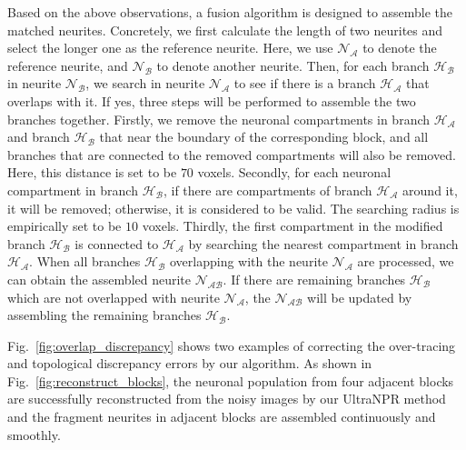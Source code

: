 Based on the above observations, a fusion algorithm is designed to assemble the matched neurites.
Concretely, we first calculate the length of two neurites and select the longer one as the reference neurite. Here, we use $\mathcal{N_A}$ to denote the reference neurite, and $\mathcal{N_B}$ to denote another neurite.
Then, for each branch $\mathcal{H_B}$ in neurite $\mathcal{N_B}$, we search in neurite $\mathcal{N_A}$ to see if there is a branch $\mathcal{H_A}$ that overlaps with it.
%
If yes, three steps will be performed to assemble the two branches together.
Firstly, we remove the neuronal compartments in branch $\mathcal{H_A}$ and branch $\mathcal{H_B}$ that near the boundary of the corresponding block, and all branches that are connected to the removed compartments will also be removed. Here, this distance is set to be $70$ voxels.
Secondly, for each neuronal compartment in branch $\mathcal{H_B}$, if there are compartments of branch $\mathcal{H_A}$ around it, it will be removed; otherwise, it is considered to be valid. The searching radius is empirically set to be $10$ voxels.
Thirdly, the first compartment in the modified branch $\mathcal{H_B}$ is connected to $\mathcal{H_A}$ by searching the nearest compartment in branch $\mathcal{H_A}$. 
When all branches $\mathcal{H_B}$ overlapping with the neurite $\mathcal{N_A}$ are processed, we can obtain the assembled neurite $\mathcal{N_{AB}}$.
If there are remaining branches $\mathcal{H_B}$ which are not overlapped with neurite $\mathcal{N_A}$, the $\mathcal{N_{AB}}$ will be updated by assembling the remaining branches $\mathcal{H_B}$.



Fig.~\ref{fig:overlap_discrepancy} shows two examples of correcting the over-tracing and topological discrepancy errors by our algorithm.
As shown in Fig.~\ref{fig:reconstruct_blocks}, the neuronal population from four adjacent blocks are successfully reconstructed from the noisy images by our UltraNPR method and the fragment neurites in adjacent blocks are assembled continuously and smoothly.


